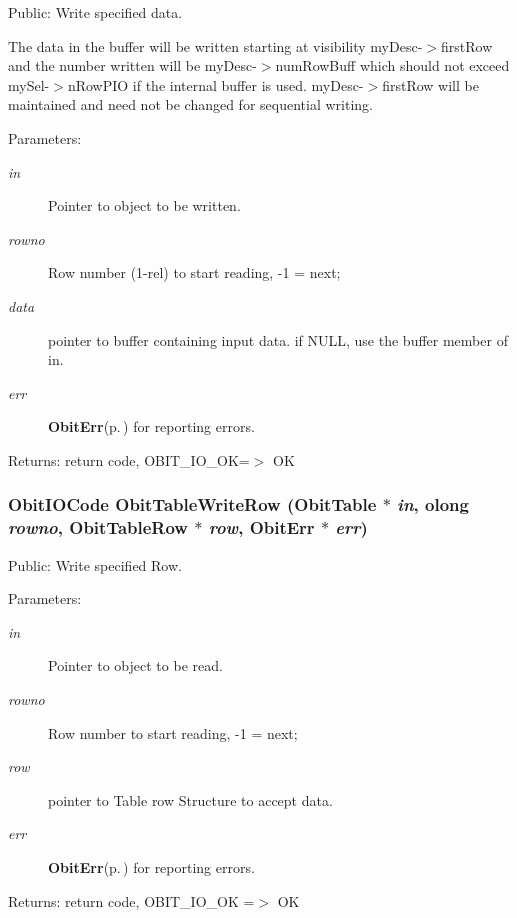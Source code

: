 Public: Write specified data. 

The data in the buffer will be written starting at visibility my\-Desc-$>$first\-Row and the number written will be my\-Desc-$>$num\-Row\-Buff which should not exceed my\-Sel-$>$n\-Row\-PIO if the internal buffer is used. my\-Desc-$>$first\-Row will be maintained and need not be changed for sequential writing. \begin{Desc}
\item[Parameters:]
\begin{description}
\item[{\em in}]Pointer to object to be written. \item[{\em rowno}]Row number (1-rel) to start reading, -1 = next; \item[{\em data}]pointer to buffer containing input data. if NULL, use the buffer member of in. \item[{\em err}]{\bf Obit\-Err}{\rm (p.\,\pageref{structObitErr})} for reporting errors. \end{description}
\end{Desc}
\begin{Desc}
\item[Returns:]return code, OBIT\_\-IO\_\-OK=$>$ OK \end{Desc}
\subsubsection{\setlength{\rightskip}{0pt plus 5cm}Obit\-IOCode Obit\-Table\-Write\-Row ({\bf Obit\-Table} $\ast$ {\em in}, {\bf olong} {\em rowno}, {\bf Obit\-Table\-Row} $\ast$ {\em row}, {\bf Obit\-Err} $\ast$ {\em err})}\label{ObitTable_8c_a32}


Public: Write specified Row. 

\begin{Desc}
\item[Parameters:]
\begin{description}
\item[{\em in}]Pointer to object to be read. \item[{\em rowno}]Row number to start reading, -1 = next; \item[{\em row}]pointer to Table row Structure to accept data. \item[{\em err}]{\bf Obit\-Err}{\rm (p.\,\pageref{structObitErr})} for reporting errors. \end{description}
\end{Desc}
\begin{Desc}
\item[Returns:]return code, OBIT\_\-IO\_\-OK =$>$ OK \end{Desc}
